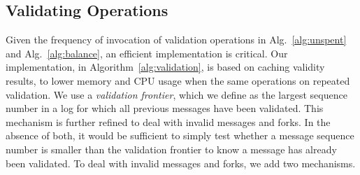 \documentclass[sigplan,screen,10pt]{acmart}
\begin{document}
\subsection{Validating Operations}
\label{section:validating-operations}

Given the frequency of invocation of validation operations in Alg.~\ref{alg:unspent} and Alg.~\ref{alg:balance}, an efficient implementation is critical. Our implementation, in Algorithm~\ref{alg:validation}, is based on caching validity results, to lower memory and CPU usage when the same operations on repeated validation. We use a \textit{validation frontier}, which we define as the largest sequence number in a log for which all previous messages have been validated. This mechanism is further refined to deal with invalid messages and forks. In the absence of both, it would be sufficient to simply test whether a message sequence number is smaller than the validation frontier to know a message has already been validated. To deal with invalid messages and forks, we add two mechanisms. 
\end{document}
